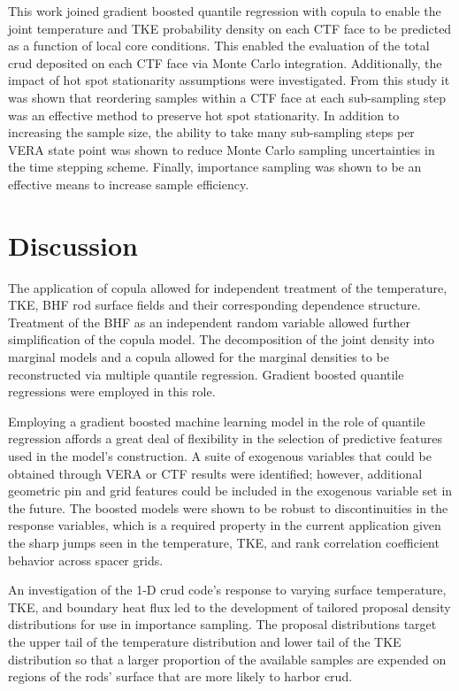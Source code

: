 
This work joined gradient boosted quantile regression with copula to enable the joint temperature and TKE probability density on each CTF face to be predicted as a function of local core conditions.  This enabled the evaluation of the total crud deposited on each CTF face via Monte Carlo integration.  Additionally, the impact of hot spot stationarity assumptions were investigated.  From this study it was shown that reordering samples within a CTF face at each sub-sampling step was an effective method to preserve hot spot stationarity.  In addition to increasing the sample size, the ability to take many sub-sampling steps per VERA state point was shown to reduce Monte Carlo sampling uncertainties in the time stepping scheme.  Finally, importance sampling was shown to be an effective means to increase sample efficiency.

\section{Discussion}

The application of copula allowed for independent treatment of the temperature, TKE, BHF rod surface fields and their corresponding dependence structure.  Treatment of the BHF as an independent random variable allowed further simplification of the copula model.  The decomposition of the joint density into marginal models and a copula allowed for the marginal densities to be reconstructed via multiple quantile regression.  Gradient boosted quantile regressions were employed in this role.

Employing a gradient boosted machine learning model in the role of quantile regression affords a great deal of flexibility in the selection of predictive features used in the model's construction.  A suite of exogenous variables that could be obtained through VERA or CTF results were identified; however,  additional geometric pin and grid features could be included in the exogenous variable set in the future.  The boosted models were shown to be robust to discontinuities in the response variables, which is a required property in the current application given the sharp jumps seen in the temperature, TKE, and rank correlation coefficient behavior across spacer grids.

An investigation of the 1-D crud code's response to varying surface temperature, TKE, and boundary heat flux led to the development of tailored proposal density distributions for use in importance sampling.   The proposal distributions target the upper tail of the temperature distribution and lower tail of the TKE distribution so that a larger proportion of the available samples are expended on regions of the rods' surface that are more likely to harbor crud.

